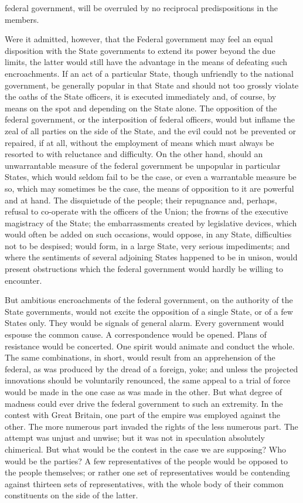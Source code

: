 federal government, will be overruled by no reciprocal predispositions in the members.

Were it admitted, however, that the Federal government may feel an equal disposition with the State governments to extend its power beyond the due limits, the latter would still have the advantage in the means of defeating such encroachments. If an act of a particular State, though unfriendly to the national government, be generally popular in that State and should not too grossly violate the oaths of the State officers, it is executed immediately and, of course, by means on the spot and depending on the State alone. The opposition of the federal government, or the interposition of federal officers, would but inflame the zeal of all parties on the side of the State, and the evil could not be prevented or repaired, if at all, without the employment of means which must always be resorted to with reluctance and difficulty. On the other hand, should an unwarrantable measure of the federal government be unpopular in particular States, which would seldom fail to be the case, or even a warrantable measure be so, which may sometimes be the case, the means of opposition to it are powerful and at hand. The disquietude of the people; their repugnance and, perhaps, refusal to co-operate with the officers of the Union; the frowns of the executive magistracy of the State; the embarrassments created by legislative devices, which would often be added on such occasions, would oppose, in any State, difficulties not to be despised; would form, in a large State, very serious impediments; and where the sentiments of several adjoining States happened to be in unison, would present obstructions which the federal government would hardly be willing to encounter.

But ambitious encroachments of the federal government, on the authority of the State governments, would not excite the opposition of a single State, or of a few States only. They would be signals of general alarm. Every government would espouse the common cause. A correspondence would be opened. Plans of resistance would be concerted. One spirit would animate and conduct the whole. The same combinations, in short, would result from an apprehension of the federal, as was produced by the dread of a foreign, yoke; and unless the projected innovations should be voluntarily renounced, the same appeal to a trial of force would be made in the one case as was made in the other. But what degree of madness could ever drive the federal government to such an extremity. In the contest with Great Britain, one part of the empire was employed against the other. The more numerous part invaded the rights of the less numerous part. The attempt was unjust and unwise; but it was not in speculation absolutely chimerical. But what would be the contest in the case we are supposing? Who would be the parties? A few representatives of the people would be opposed to the people themselves; or rather one set of representatives would be contending against thirteen sets of representatives, with the whole body of their common constituents on the side of the latter.

